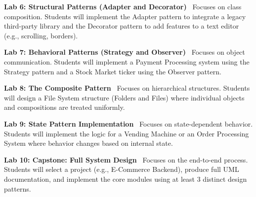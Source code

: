\vspace{0.2cm}

\noindent\textbf{Lab 6: Structural Patterns (Adapter and Decorator)} \
Focuses on class composition. Students will implement the Adapter pattern to integrate a legacy third-party library and the Decorator pattern to add features to a text editor (e.g., scrolling, borders). \\

\vspace{0.2cm}

\noindent\textbf{Lab 7: Behavioral Patterns (Strategy and Observer)} \
Focuses on object communication. Students will implement a Payment Processing system using the Strategy pattern and a Stock Market ticker using the Observer pattern. \\

\vspace{0.2cm}

\noindent\textbf{Lab 8: The Composite Pattern} \
Focuses on hierarchical structures. Students will design a File System structure (Folders and Files) where individual objects and compositions are treated uniformly. \\

\vspace{0.2cm}

\noindent\textbf{Lab 9: State Pattern Implementation} \
Focuses on state-dependent behavior. Students will implement the logic for a Vending Machine or an Order Processing System where behavior changes based on internal state. \\

\vspace{0.2cm}

\noindent\textbf{Lab 10: Capstone: Full System Design} \
Focuses on the end-to-end process. Students will select a project (e.g., E-Commerce Backend), produce full UML documentation, and implement the core modules using at least 3 distinct design patterns.

\newpage
{}